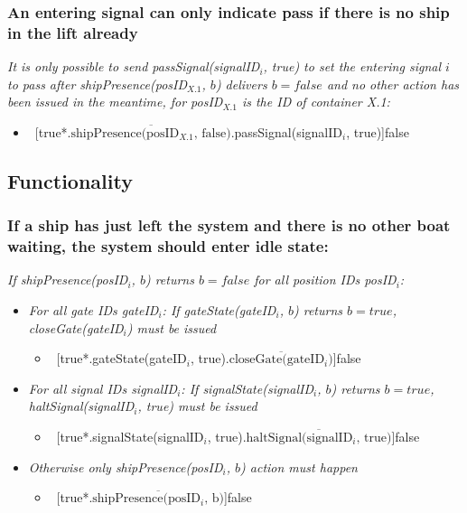 \subsubsection{An entering signal can only indicate pass if there is no ship in the lift already}
\textit{It is only possible to send passSignal(signalID$_i$, true) to set the entering signal $i$ to pass after shipPresence(posID$_{X.1}$, $b$) delivers $b = false$ and no other action has been issued in the meantime, for posID$_{X.1}$ is the ID of container X.1:}
\begin{itemize}
	\item ~[true*.$\overline{\textrm{shipPresence(posID$_{X.1}$, false)}}$.passSignal(signalID$_i$, true)]false
\end{itemize}


\subsection{Functionality}
\subsubsection{If a ship has just left the system and there is no other boat waiting, the system should enter idle state:}
\textit{If shipPresence(posID$_i$, $b$) returns $b = false$ for all position IDs posID$_i$:}
\begin{itemize}
	\item \textit{For all gate IDs gateID$_i$: If gateState(gateID$_i$, $b$) returns $b = true$, \linebreak closeGate(gateID$_i$) must be issued}
	\begin{itemize}
		\item ~[true*.gateState(gateID$_i$, true).$\overline{\textrm{closeGate(gateID$_i$)}}$]false
	\end{itemize}
	\item \textit{For all signal IDs signalID$_i$: If signalState(signalID$_i$, $b$) returns $b = true$, haltSignal(signalID$_i$, true) must be issued}
	\begin{itemize}
		\item ~[true*.signalState(signalID$_i$, true).$\overline{\textrm{haltSignal(signalID$_i$, true)}}$]false
	\end{itemize}
	\item \textit{Otherwise only shipPresence(posID$_i$, $b$) action must happen}
	\begin{itemize}
		\item ~[true*.$\overline{\textrm{shipPresence(posID$_i$, b)}}$]false
	\end{itemize}
\end{itemize}

